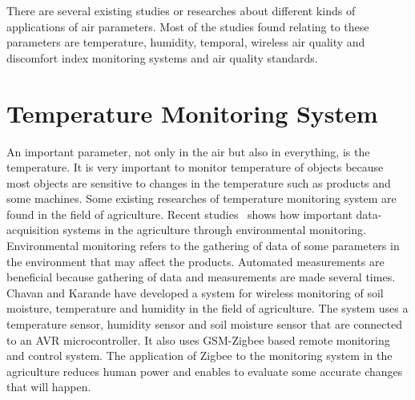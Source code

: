
There are several existing studies or researches about different kinds of applications of air parameters. Most of the studies found relating to these parameters are temperature, humidity, temporal, wireless air quality and discomfort index monitoring systems and air quality standards.

\section{Temperature Monitoring System}

An important parameter, not only in the air but also in everything, is the temperature. It is very important to monitor temperature of objects because most objects are sensitive to changes in the temperature such as products and some machines. Some existing researches of temperature monitoring system are found in the field of agriculture. Recent studies~\cite{Chavan} shows how important data-acquisition systems in the agriculture through environmental monitoring. Environmental monitoring refers to the gathering of data of some parameters in the environment that may affect the products. Automated measurements are beneficial because gathering of data and measurements are made several times. Chavan and Karande have developed a system for wireless monitoring of soil moisture, temperature and humidity in the field of agriculture. The system uses a temperature sensor, humidity sensor and soil moisture sensor that are connected to an AVR microcontroller. It also uses GSM-Zigbee based remote monitoring and control system. The application of Zigbee to the monitoring system in the agriculture reduces human power and enables to evaluate some accurate changes that will happen. 

